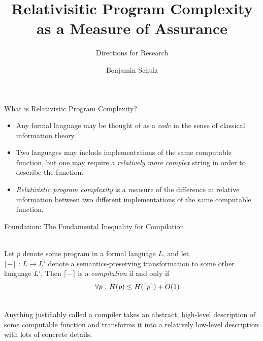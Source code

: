 \documentclass{beamer}
\title{Relativisitic Program Complexity as a Measure of Assurance}
\subtitle{Directions for Research}
\author{Benjamin Schulz}
\newcommand{\compile}[1]{\ensuremath{\lceil #1 \rceil}}
\begin{document}
\maketitle{}

\begin{frame}{What is Relativistic Program Complexity?}

\begin{itemize}

\item{
 Any formal language may be thought of as a \emph{code} in the sense of
 classical information theory.
}

\item{
 Two languages may include implementations of the same computable function,
 but one may require a \emph{relatively more complex} string in order to
 describe the function.
}

\item{
 \emph{Relativistic program complexity} is a measure of
 the difference in relative information between two different implementations
 of the same computable function.
}


\end{itemize}

\end{frame}

\begin{frame}{Foundation: The Fundamental Inequality for Compilation}

{
\\
Let $p$ denote some program in a formal language $L$, and let\\
\compile{-} : $L \rightarrow L\prime$
denote a semantics-preserving transformation to some other language $L\prime$.
Then \compile{-} is a \emph{compilation} if and only if\\
\[
\indent \forall p\ .\ H(p) \le H(\compile p) + O(1)
\]
}

{
\\
Anything justifiably called a compiler takes an abstract, high-level
description of some computable function and transforms it into a
relatively low-level description with lots of concrete details.
}

\end{frame}
\end{document}
